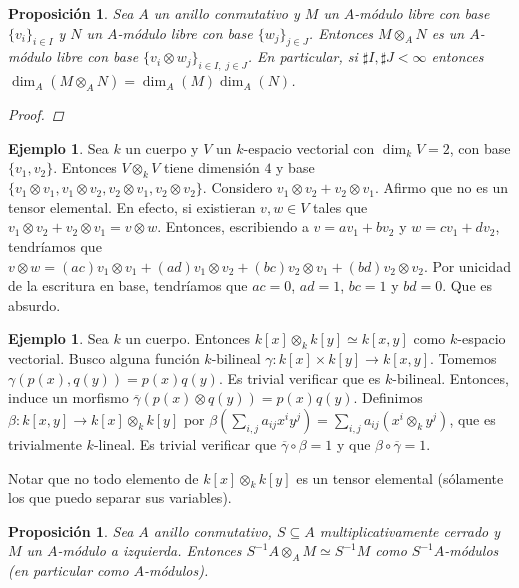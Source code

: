 \documentclass[12pt]{book}
\newtheorem{prop}[teo]{Proposición}
\theoremstyle{definition}
\newtheorem{ex}[teo]{Ejemplo}
\begin{document}
\begin{prop}
Sea $A$ un anillo conmutativo y $M$ un $A$-módulo libre con base $\{v_i\}_{i\in I}$ y $N$ un $A$-módulo libre con base $\{w_j\}_{j\in J}$. Entonces $M\otimes_A N$ es un $A$-módulo libre con base $\{v_i\otimes w_j\}_{i\in I,\; j\in J}$. En particular, si $\sharp I,\sharp J <\infty$ entonces $\dim_A(M\otimes_A N)=\dim_A(M)\dim_A(N)$.
\begin{proof}

\end{proof}
\end{prop}

\begin{ex}
Sea $k$ un cuerpo y $V$ un $k$-espacio vectorial con $\dim_k V = 2$, con base $\{v_1,v_2\}$. Entonces $V\otimes_k V$ tiene dimensión $4$ y base $\{v_1\otimes v_1, v_1\otimes v_2, v_2\otimes v_1, v_2\otimes v_2\}$. Considero $v_1\otimes v_2 + v_2\otimes v_1$. Afirmo que no es un tensor elemental. En efecto, si existieran $v,w\in V$ tales que $v_1\otimes v_2 + v_2\otimes v_1 = v\otimes w$. Entonces, escribiendo a $v=av_1+bv_2$ y $w=cv_1 + dv_2$, tendríamos que $v\otimes w = (ac)v_1\otimes v_1 + (ad)v_1\otimes v_2 + (bc)v_2\otimes v_1 + (bd)v_2\otimes v_2$. Por unicidad de la escritura en base, tendríamos que $ac=0$, $ad=1$, $bc=1$ y $bd=0$. Que es absurdo.
\end{ex}

\begin{ex}
Sea $k$ un cuerpo. Entonces $k[x]\otimes_k k[y]\simeq k[x,y]$ como $k$-espacio vectorial. Busco alguna función $k$-bilineal $\gamma:k[x]\times k[y]\to k[x,y]$. Tomemos $\gamma(p(x),q(y)) = p(x)q(y)$. Es trivial verificar que es $k$-bilineal. Entonces, induce un morfismo $\overline{\gamma}(p(x)\otimes q(y)) = p(x)q(y)$. Definimos $\beta:k[x,y]\to k[x]\otimes_k k[y]$ por $\beta\left(\displaystyle\sum_{i,j}a_{ij}x^i y^j\right) = \displaystyle\sum_{i,j}a_{ij}(x^i\otimes_k y^j)$, que es trivialmente $k$-lineal. Es trivial verificar que $\overline{\gamma}\circ \beta=1$ y que $\beta\circ\overline{\gamma}=1$.

Notar que no todo elemento de $k[x]\otimes_k k[y]$ es un tensor elemental (sólamente los que puedo separar sus variables).
\end{ex}

\begin{prop}
Sea $A$ anillo conmutativo, $S\subseteq A$ multiplicativamente cerrado y $M$ un $A$-módulo a izquierda. Entonces $S^{-1}A\otimes_A M\simeq S^{-1}M$ como $S^{-1}A$-módulos (en particular como $A$-módulos).
\end{prop}
\end{document}

